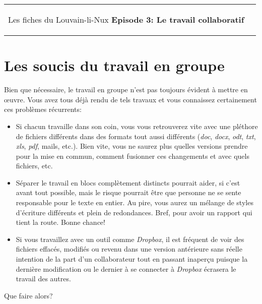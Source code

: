 



\begin{tabular}{p{14cm}r}
    \begin{center}{\Large Les fiches du Louvain-li-Nux\linebreak \linebreak
	\LARGE \textbf{Episode 3: Le travail collaboratif}}\end{center}
		&
	\usebox{\logollnux}
\end{tabular}
\vspace{-.5cm}

\section*{Les soucis du travail en groupe}
Bien que nécessaire,
le travail en groupe n'est pas toujours évident à mettre en \oe uvre. 
Vous avez tous déjà rendu de tels travaux et vous connaissez certainement ces problèmes récurrents:
\begin{itemize}
	\item Si chacun travaille dans son coin, vous vous retrouverez vite avec une pléthore de fichiers différents dans des formats tout aussi différents (\textit{doc}, \textit{docx}, \textit{odt}, \textit{txt}, \textit{xls}, \textit{pdf}, mails, etc.). Bien vite, vous ne saurez plus quelles versions prendre pour la mise en commun, comment fusionner ces changements et avec quels fichiers, etc.
	\item Séparer le travail en blocs complètement distincts pourrait aider, si c'est avant tout possible, mais le risque pourrait être que personne ne se sente responsable pour le texte en entier. Au pire, vous aurez un mélange de styles d'écriture différents et plein de redondances. Bref, pour avoir un rapport qui tient la route. Bonne chance!
	\item Si vous travaillez avec un outil comme \textit{Dropbox}, il est fréquent de voir des fichiers effacés, modifiés ou revenu dans une version antérieure sans réelle intention de la part d'un collaborateur tout en passant inaperçu puisque la dernière modification ou le dernier à se connecter à \textit{Dropbox} écrasera le travail des autres.
\end{itemize}
Que faire alors?

